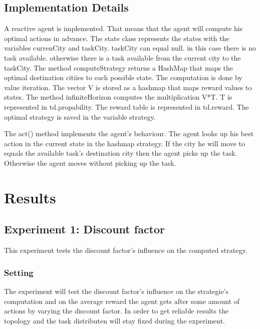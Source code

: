 \documentclass[11pt]{article}
\begin{document}
\subsection{Implementation Details}
A reactive agent is implemented. That means that the agent will compute his optimal actions in advance. 
The state class represents the states with the variables currenCity and taskCity. taskCity can equal null. in this case there is no task available. otherwise there is a task available from the current city to the taskCity. 
The method computeStrategy returns a HashMap that maps the optimal destination citiies to each possible state. The computation is done by value iteration. The vector V is stored as a hashmap that maps reward values to states. 
The method infiniteHorizon computes the multiplication V*T. T is represented in td.propability. 
The reward table is represented in td.reward. The optimal strategy is saved in the variable strategy.

The act() method implements the agent's behaviour. The agent looks up his best action in the current state in the hashmap strategy. If the city he will move to equals the available task's destination city then the agent picks up the task. Otherwise the agent moves without picking up the task.


\section{Results}

\subsection{Experiment 1: Discount factor}
This experiment tests the discount factor's influence on the computed strategy.  

\subsubsection{Setting}
The experiment will test the discount factor's influence on the strategie's computation and on the average reward the agent gets after some amount of actions by varying the discount factor. In order to get reliable results the topology and the task distributen will stay fixed during the experiment. 
\end{document}
